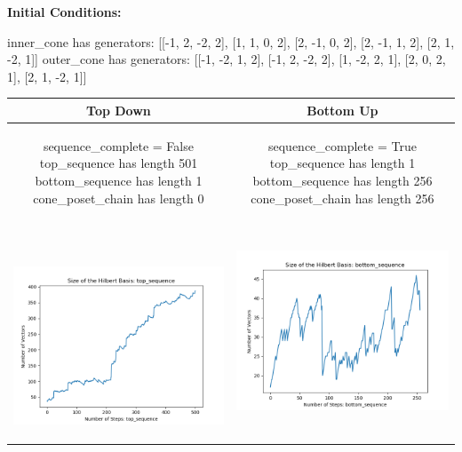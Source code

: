 \documentclass[10pt]{article}
\begin{document}
\textbf{Initial Conditions:}
\begin{SAGE}
inner_cone has generators: 
[[-1, 2, -2, 2], [1, 1, 0, 2], [2, -1, 0, 2], [2, -1, 1, 2], [2, 1, -2, 1]]
outer_cone has generators: 
[[-1, -2, 1, 2], [-1, 2, -2, 2], [1, -2, 2, 1], [2, 0, 2, 1], [2, 1, -2, 1]]

\end{SAGE}
\begin{tabular}{c|c}
\textbf{Top Down} & \textbf{Bottom Up} \\ \hline  
\begin{SAGE}
	sequence_complete = False
	top_sequence has length 501
	bottom_sequence has length 1
	cone_poset_chain has length 0
\end{SAGE} 
&
\begin{SAGE}
	sequence_complete = True
	top_sequence has length 1
	bottom_sequence has length 256
	cone_poset_chain has length 256
\end{SAGE} 
\\ \hline
\
\begin{minipage}{.45\textwidth}
\includegraphics[width=\textwidth]{"DATA/4d/5 generators 2 bound J/top_sequence SIZE"}
\end{minipage} &
\begin{minipage}{.45\textwidth}
\includegraphics[width=\textwidth]{"DATA/4d/5 generators 2 bound J bottomup/bottom_sequence SIZE"}

\end{minipage}
\end{tabular}
\end{document}
